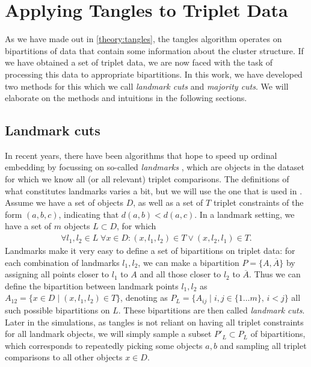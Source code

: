 \chapter{Applying Tangles to Triplet Data}\label{methods}
As we have made out in \autoref{theory:tangles}, the tangles algorithm operates on bipartitions of data that contain some information about the cluster structure.
If we have obtained a set of triplet data, we are now faced with the task of processing this data to appropriate bipartitions. In this work, we have developed two
methods for this which we call \textit{landmark cuts} and \textit{majority cuts}. We will elaborate on the methods and intuitions in the following sections.

\section{Landmark cuts}\label{theory:landmark_cuts}
In recent years, there have been algorithms that hope to speed up ordinal embedding by focussing on so-called \textit{landmarks} \citep{ghoshLandmarkOrdinalEmbedding2019, andertonScalingOrdinalEmbedding2019}, which are objects in the dataset for which we know all (or all relevant) triplet comparisons.  
The definitions of what constitutes landmarks varies a bit, but we will use the one that is used in \cite{haghiriComparisonBasedFrameworkPsychophysics2019}.
Assume we have a set of objects $D$, as well as a set of $T$ triplet constraints of the form $(a,b,c)$, indicating that $d(a,b) < d(a,c)$. In a landmark setting, we have a set 
of $m$ objects $L \subset D$, for which 
\begin{align*}
\forall l_1, l_2 \in L \; \forall x \in D: (x, l_1, l_2) \in T \vee (x, l_2, l_1) \in T. 
\end{align*}
Landmarks make it very easy to define a set of bipartitions on triplet data:
for each combination of landmarks $l_1, l_2$, we can make a bipartition $P = \{A, \overline{A}\}$ by assigning all points closer to $l_1$ to $A$ and all 
those closer to $l_2$ to $\overline{A}$. Thus we can define the bipartition between landmark points $l_1, l_2$ as $A_{12} = \{ x \in D \mid \left( x, l_1, l_2 \right) \in T \}$, 
denoting as $P_L = \{A_{ij}  \mid i, j \in \{1\ldots m\},\, i < j\}$ all such possible bipartitions on $L$. 
These bipartitions are then called \textit{landmark cuts}.
Later in the simulations, as tangles is not reliant on having all triplet constraints for all landmark objects, we will simply sample a subset $P'_{L} \subset P_L$ of bipartitions,
which corresponds to repeatedly picking some objects $a, b$ and sampling all triplet comparisons to all other objects $x \in D$. \\


